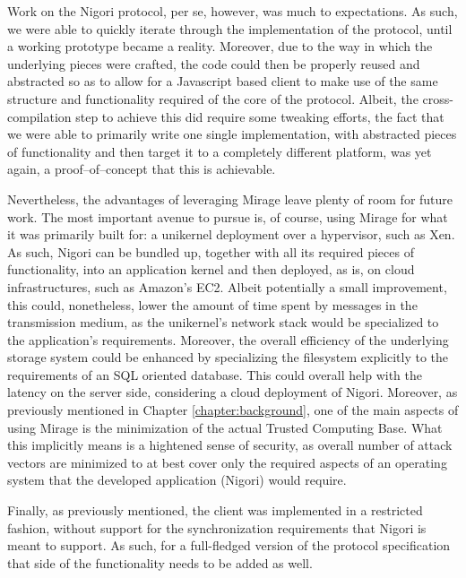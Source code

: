 Work on the Nigori protocol, per se, however, was much to expectations.
As such, we were able to quickly iterate through the implementation of the protocol, until a working prototype became a reality.
Moreover, due to the way in which the underlying pieces were crafted, the code could then be properly reused and abstracted so as to allow for a Javascript based client to make use of the same structure and functionality required of the core of the protocol.
Albeit, the cross-compilation step to achieve this did require some tweaking efforts, the fact that we were able to primarily write one single implementation, with abstracted pieces of functionality and then target it to a completely different platform, was yet again, a proof--of--concept that this is achievable.

Nevertheless, the advantages of leveraging Mirage leave plenty of room for future work.
The most important avenue to pursue is, of course, using Mirage for what it was primarily built for: a unikernel deployment over a hypervisor, such as Xen.
As such, Nigori can be bundled up, together with all its required pieces of functionality, into an application kernel and then deployed, as is, on cloud infrastructures, such as Amazon's EC2.
Albeit potentially a small improvement, this could, nonetheless, lower the amount of time spent by messages in the transmission medium, as the unikernel's network stack would be specialized to the application's requirements.
Moreover, the overall efficiency of the underlying storage system could be enhanced by specializing the filesystem explicitly to the requirements of an SQL oriented database.
This could overall help with the latency on the server side, considering a cloud deployment of Nigori.
Moreover, as previously mentioned in Chapter \ref{chapter:background}, one of the main aspects of using Mirage is the minimization of the actual Trusted Computing Base.
What this implicitly means is a hightened sense of security, as overall number of attack vectors are minimized to at best cover only the required aspects of an operating system that the developed application (Nigori) would require.

Finally, as previously mentioned, the client was implemented in a restricted fashion, without support for the synchronization requirements that Nigori is meant to support.
As such, for a full-fledged version of the protocol specification that side of the functionality needs to be added as well.
